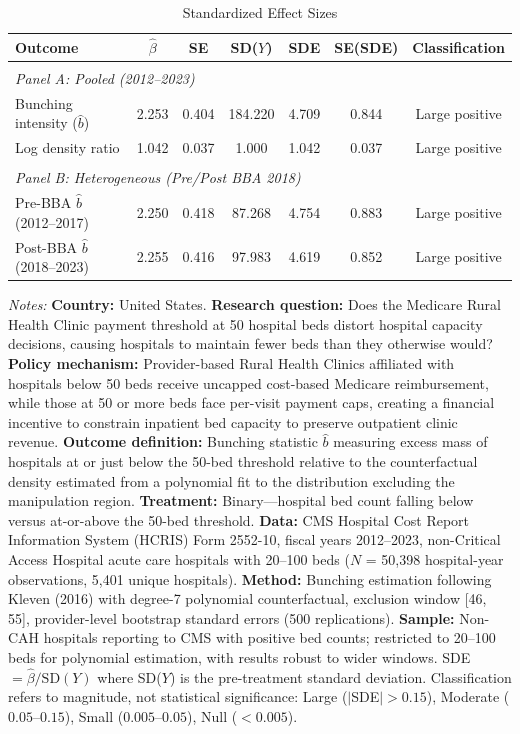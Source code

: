 \begin{table}[t]
\centering
\caption{Standardized Effect Sizes}
\label{tab:sde}
\small
\begin{tabular}{lcccccc}
\hline\hline
Outcome & $\hat{\beta}$ & SE & SD($Y$) & SDE & SE(SDE) & Classification \\
\hline
\\[-6pt]
\multicolumn{7}{l}{\textit{Panel A: Pooled (2012--2023)}} \\
Bunching intensity ($\hat{b}$) & 2.253 & 0.404 & 184.220 & 4.709 & 0.844 & Large positive \\
Log density ratio & 1.042 & 0.037 & 1.000 & 1.042 & 0.037 & Large positive \\
\\[-6pt]
\multicolumn{7}{l}{\textit{Panel B: Heterogeneous (Pre/Post BBA 2018)}} \\
Pre-BBA $\hat{b}$ (2012--2017) & 2.250 & 0.418 & 87.268 & 4.754 & 0.883 & Large positive \\
Post-BBA $\hat{b}$ (2018--2023) & 2.255 & 0.416 & 97.983 & 4.619 & 0.852 & Large positive \\
\hline\hline
\end{tabular}
\begin{tablenotes}
\item \textit{Notes:} \textbf{Country:} United States. \textbf{Research question:} Does the Medicare Rural Health Clinic payment threshold at 50 hospital beds distort hospital capacity decisions, causing hospitals to maintain fewer beds than they otherwise would? \textbf{Policy mechanism:} Provider-based Rural Health Clinics affiliated with hospitals below 50 beds receive uncapped cost-based Medicare reimbursement, while those at 50 or more beds face per-visit payment caps, creating a financial incentive to constrain inpatient bed capacity to preserve outpatient clinic revenue. \textbf{Outcome definition:} Bunching statistic $\hat{b}$ measuring excess mass of hospitals at or just below the 50-bed threshold relative to the counterfactual density estimated from a polynomial fit to the distribution excluding the manipulation region. \textbf{Treatment:} Binary---hospital bed count falling below versus at-or-above the 50-bed threshold. \textbf{Data:} CMS Hospital Cost Report Information System (HCRIS) Form 2552-10, fiscal years 2012--2023, non-Critical Access Hospital acute care hospitals with 20--100 beds ($N$ = 50,398 hospital-year observations, 5,401 unique hospitals). \textbf{Method:} Bunching estimation following Kleven (2016) with degree-7 polynomial counterfactual, exclusion window [46, 55], provider-level bootstrap standard errors (500 replications). \textbf{Sample:} Non-CAH hospitals reporting to CMS with positive bed counts; restricted to 20--100 beds for polynomial estimation, with results robust to wider windows. SDE $= \hat{\beta} / \text{SD}(Y)$ where SD($Y$) is the pre-treatment standard deviation. Classification refers to magnitude, not statistical significance: Large ($|$SDE$| > 0.15$), Moderate ($0.05$--$0.15$), Small ($0.005$--$0.05$), Null ($< 0.005$).
\end{tablenotes}
\end{table}

